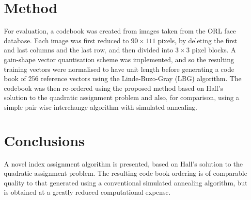 \documentclass[a4paper]{report}
\begin{document}
\chapter{Method}

For evaluation, a codebook was created from images taken from the ORL face
database.  Each image was first reduced to $90 \times 111$ pixels,
by deleting the first and last columns and the last row, and then divided into
$3 \times 3$ pixel blocks.  A gain-shape vector quantisation scheme was
implemented, and so the resulting training vectors were normalised to have unit
length before generating a code book of 256 reference vectors using the
Linde-Buzo-Gray (LBG) algorithm.  The codebook was then
re-ordered using the proposed method based on Hall's solution to the quadratic
assignment problem and also, for comparison, using a simple pair-wise
interchange algorithm with simulated annealing.

\chapter{Conclusions}

A novel index assignment algorithm is presented, based on Hall's solution to the
quadratic assignment problem.  The resulting code book ordering is of comparable
quality to that generated using a conventional simulated annealing algorithm,
but is obtained at a greatly reduced computational expense.
\end{document}
